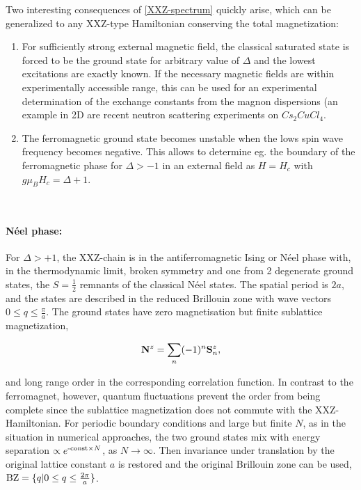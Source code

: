 \documentclass{homework}
\begin{document}

\begin{tcolorbox}[colback =yellow, title = Physical Context]

Two interesting consequences of \cref{XXZ-spectrum} quickly arise, which can be generalized to any XXZ-type Hamiltonian conserving the total magnetization: 

\begin{enumerate}
    \item For sufficiently strong external magnetic field, the classical saturated state is forced to be the ground state for arbitrary value of $\Delta$ and the lowest excitations are exactly known. If the necessary magnetic fields are within experimentally accessible range, this can be used for an experimental determination of the exchange constants from the magnon dispersions (an example in 2D are recent neutron scattering experiments on $Cs_2 Cu Cl_4$. \\
    \item The ferromagnetic ground state becomes unstable when the lows spin wave frequency becomes negative. This allows to determine eg. the boundary of the ferromagnetic phase for $\Delta > -1$ in an external field as $H = H_c$ with $g \mu_B H_c = \Delta + 1$. 
\end{enumerate}


\end{tcolorbox}

\blanky \\

\paragraph{\textbf{Néel phase:}}

For $\Delta > +1$, the XXZ-chain is in the antiferromagnetic Ising or Néel phase with, in the thermodynamic limit, broken symmetry and one from 2 degenerate ground states, the $S=\frac{1}{2}$ remnants of the classical Néel states. The spatial period is $2a$, and the states are described in the reduced Brillouin zone with wave vectors $0 \leq q \leq \frac{\pi}{a}$. The ground states have zero magnetisation but finite sublattice magnetization, 

$$
{\bf N}^z = \sum_{n} (-1)^n {\bf S}_n^z,
$$

and long range order in the corresponding correlation function. In contrast to the ferromagnet, however, quantum fluctuations prevent the order from being complete since the sublattice magnetization does not commute with the XXZ-Hamiltonian. For periodic boundary conditions and large but finite $N$, as in the situation in numerical approaches, the two ground states mix with energy separation $\propto e^{\textnormal{-const}\times N}$, as $N \rightarrow \infty$. Then invariance under translation by the original lattice constant $a$ is restored and the original Brillouin zone can be used, $\textnormal{BZ} = \{q | 0 \leq q \leq \frac{2\pi}{a}\}$. \\
\end{document}
